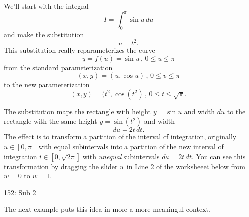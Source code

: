 \documentclass{ximera}
\begin{document}
\begin{example} \label{EKEMrerMMEF}
We'll start with the integral
\[
      I = \int_0^\pi \sin u \, du
\]
and make the substitution 
\[
     u = t^2 .
\]
This substitution really reparameterizes the curve
\[
   y = f(u) = \sin u \, , \, 0\leq u \leq \pi
\] 
from the standard parameterization
\[
   (x,y) = (u,\cos u) \, , \, 0\leq u \leq \pi
\]
to the new parameterization
\[
   (x,y) = (t^2,\cos (t^2) \, , \, 0\leq t \leq \sqrt{\pi}.
\]

The substitution maps the rectangle with height $y=\sin u$ and width $du$ to the rectangle with the same height $y=\sin(t^2)$ and width
\[
   du = 2t \,dt .
\]
The effect is to transform a partition of the interval of integration, originally $u\in [0,\pi]$ with equal subintervals into a partition of the new interval of integration $t\in [0,\sqrt{2\pi}]$ with \emph{unequal} subintervals $du=2t\, dt$. You can see this transformation by dragging the slider $w$ in Line 2 of the worksheeet below from $w=0$ to $w=1$.



\begin{onlineOnly}
    \begin{center}
\end{center}
\end{onlineOnly}

\href{https://www.desmos.com/calculator/toiwzzqkva}{152: Sub 2}

\end{example}

The next example puts this idea in more a more meaningul context.
\end{document}
